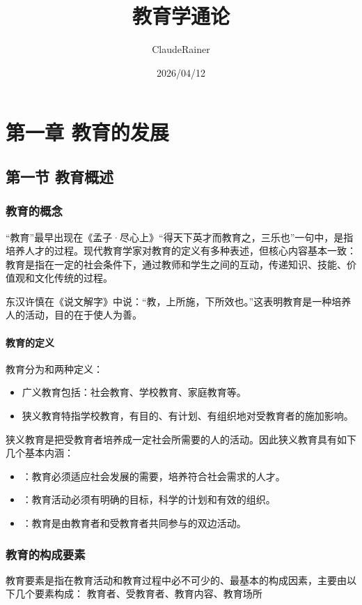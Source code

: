 \documentclass[b5paper,11pt]{article}
\title{教育学通论}
\date{2026/04/12}
\author{ClaudeRainer}
\begin{document}
\maketitle

\section{第一章 教育的发展}
\subsection{第一节 \space 教育概述}
\subsubsection{教育的概念}
“教育”最早出现在《孟子·尽心上》“得天下英才而教育之，三乐也”一句中，是指培养人才的过程。现代教育学家对教育的定义有多种表述，但核心内容基本一致：教育是指在一定的社会条件下，通过教师和学生之间的互动，传递知识、技能、价值观和文化传统的过程。

东汉许慎在《说文解字》中说：“教，上所施，下所效也。”这表明教育是一种培养人的活动，目的在于使人为善。

\paragraph{教育的定义}
教育分为和两种定义：
\begin{itemize}
  \item 广义教育包括：社会教育、学校教育、家庭教育等。
  \item 狭义教育特指学校教育，\textcolor{ctp-red}{有目的、有计划、有组织}地对受教育者的施加影响。
\end{itemize}

狭义教育是把受教育者培养成\textcolor{ctp-red}{一定社会所需要的人}的活动。因此狭义教育具有如下几个基本内涵：
\begin{itemize}
  \item {}：教育必须适应社会发展的需要，培养符合社会需求的人才。
  \item {}：教育活动必须有明确的目标，科学的计划和有效的组织。
  \item {}：教育是由教育者和受教育者共同参与的双边活动。
\end{itemize}

\subsubsection{教育的构成要素}
教育要素是指在教育活动和教育过程中必不可少的、最基本的构成因素，主要由以下几个要素构成：
\textcolor{ctp-peach}{教育者、受教育者、教育内容、教育场所}
\end{document}
